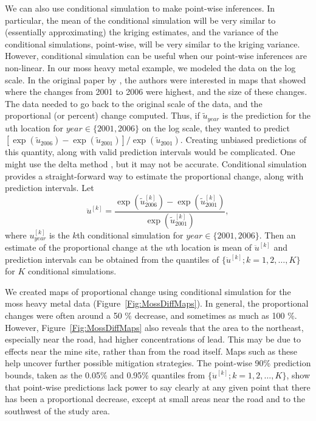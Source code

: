 \documentclass[12pt, titlepage]{article}
\begin{document}
We can also use conditional simulation to make point-wise inferences.  In particular, the mean of the conditional simulation will be very similar to (essentially approximating) the kriging estimates, and the variance of the conditional simulations, point-wise, will be very similar to the kriging variance.  However, conditional simulation can be useful when our point-wise inferences are non-linear.  In our moss heavy metal example, we modeled the data on the log scale.  In the original paper by \citet{NeitlichEtAl2017Trendsspatialpatterns}, the authors were interested in maps that showed where the changes from 2001 to 2006 were highest, and the size of these changes.  The data needed to go back to the original scale of the data, and the proportional (or percent) change computed.  Thus, if $\tilde{u}_{year}$ is the prediction for the $u$th location for $year \in \{2001, 2006\}$ on the log scale, they wanted to predict $[\exp(\tilde{u}_{2006}) - \exp(\tilde{u}_{2001})]/\exp(\tilde{u}_{2001})$.  Creating unbiased predictions of this quantity, along with valid prediction intervals would be complicated.  One might use the delta method \citep{VerHoef2012Whoinventeddelta124}, but it may not be accurate.  Conditional simulation provides a straight-forward way to estimate the proportional change, along with prediction intervals. Let
$$
\ddot{u}^{[k]}= \frac{\exp(\tilde{u}_{2006}^{[k]}) - \exp(\tilde{u}_{2001}^{[k]})}{\exp(\tilde{u}_{2001}^{[k]})},
$$  
where ${u}_{year}^{[k]}$ is the $k$th conditional simulation for $year\in \{2001, 2006\}$.  Then an estimate of the proportional change at the $u$th location is mean of $\ddot{u}^{[k]}$ and prediction intervals can be obtained from the quantiles of $\{\ddot{u}^{[k]};k = 1, 2, \ldots, K\}$ for $K$ conditional simulations.

We created maps of proportional change using conditional simulation for the moss heavy metal data (Figure~\ref{Fig:MossDiffMaps}).  In general, the proportional changes were often around a 50 \% decrease, and sometimes as much as 100 \%.  However, Figure~\ref{Fig:MossDiffMaps} also reveals that the area to the northeast, especially near the road, had higher concentrations of lead.  This may be due to effects near the mine site, rather than from the road itself.  Maps such as these help uncover further possible mitigation strategies.  The point-wise 90\% prediction bounds, taken as the 0.05\% and 0.95\% quantiles from $\{\ddot{u}^{[k]};k = 1, 2, \ldots, K\}$, show that point-wise predictions lack power to say clearly at any given point that there has been a proportional decrease, except at small areas near the road and to the southwest of the study area.
\end{document}
